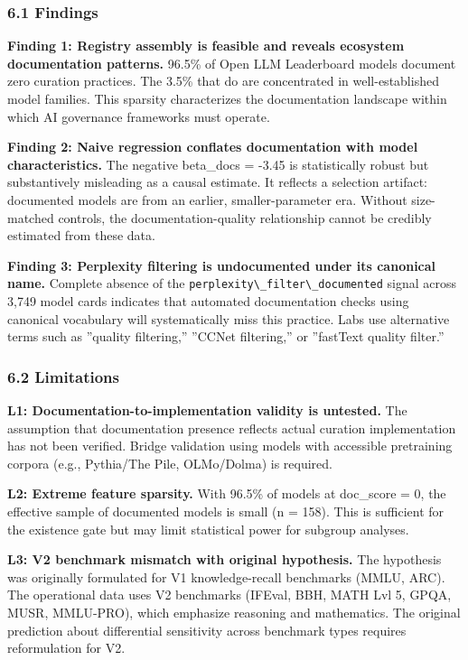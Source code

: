 
\subsubsection{6.1 Findings}

\textbf{Finding 1: Registry assembly is feasible and reveals ecosystem documentation patterns.} 96.5\% of Open LLM Leaderboard models document zero curation practices. The 3.5\% that do are concentrated in well-established model families. This sparsity characterizes the documentation landscape within which AI governance frameworks must operate.

\textbf{Finding 2: Naive regression conflates documentation with model characteristics.} The negative beta\_docs = -3.45 is statistically robust but substantively misleading as a causal estimate. It reflects a selection artifact: documented models are from an earlier, smaller-parameter era. Without size-matched controls, the documentation-quality relationship cannot be credibly estimated from these data.

\textbf{Finding 3: Perplexity filtering is undocumented under its canonical name.} Complete absence of the \texttt{perplexity\textbackslash \_filter\textbackslash \_documented} signal across 3,749 model cards indicates that automated documentation checks using canonical vocabulary will systematically miss this practice. Labs use alternative terms such as ''quality filtering,'' ''CCNet filtering,'' or ''fastText quality filter.''

\subsubsection{6.2 Limitations}

\textbf{L1: Documentation-to-implementation validity is untested.} The assumption that documentation presence reflects actual curation implementation has not been verified. Bridge validation using models with accessible pretraining corpora (e.g., Pythia/The Pile, OLMo/Dolma) is required.

\textbf{L2: Extreme feature sparsity.} With 96.5\% of models at doc\_score = 0, the effective sample of documented models is small (n = 158). This is sufficient for the existence gate but may limit statistical power for subgroup analyses.

\textbf{L3: V2 benchmark mismatch with original hypothesis.} The hypothesis was originally formulated for V1 knowledge-recall benchmarks (MMLU, ARC). The operational data uses V2 benchmarks (IFEval, BBH, MATH Lvl 5, GPQA, MUSR, MMLU-PRO), which emphasize reasoning and mathematics. The original prediction about differential sensitivity across benchmark types requires reformulation for V2.

